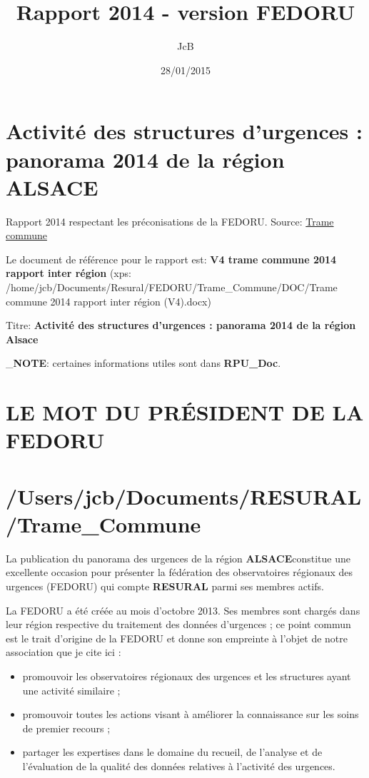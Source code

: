 \documentclass[]{article}
\title{Rapport 2014 - version FEDORU}
\author{JcB}
\date{28/01/2015}
\begin{document}
\maketitle


{
\hypersetup{linkcolor=black}
\setcounter{tocdepth}{2}
\tableofcontents
}
\section{Activité des structures d'urgences : panorama 2014 de la région
ALSACE}\label{activite-des-structures-durgences-panorama-2014-de-la-region-alsace}

Rapport 2014 respectant les préconisations de la FEDORU. Source:
\href{https://docs.google.com/document/d/101LYVqVLeHZnrujfMm3aqBYfbOwx3CPEB3Y-Lbud2Ls/edit}{Trame
commune}

Le document de référence pour le rapport est: \textbf{V4 trame commune
2014 rapport inter région} (xps:
/home/jcb/Documents/Resural/FEDORU/Trame\_Commune/DOC/Trame commune 2014
rapport inter région (V4).docx)

Titre: \textbf{Activité des structures d'urgences : panorama 2014 de la
région Alsace}

\_\textbf{NOTE}: certaines informations utiles sont dans
\textbf{RPU\_Doc}.

\section{LE MOT DU PRÉSIDENT DE LA
FEDORU}\label{le-mot-du-president-de-la-fedoru}

\section{/Users/jcb/Documents/RESURAL/Trame\_Commune}\label{usersjcbdocumentsresuraltrameux5fcommune}

La publication du panorama des urgences de la région
\textbf{ALSACE}constitue une excellente occasion pour présenter la
fédération des observatoires régionaux des urgences (FEDORU) qui compte
\textbf{RESURAL} parmi ses membres actifs.

La FEDORU a été créée au mois d'octobre 2013. Ses membres sont chargés
dans leur région respective du traitement des données d'urgences ; ce
point commun est le trait d'origine de la FEDORU et donne son empreinte
à l'objet de notre association que je cite ici :

\begin{itemize}
\itemsep1pt\parskip0pt
\item
  promouvoir les observatoires régionaux des urgences et les structures
  ayant une activité similaire ;
\item
  promouvoir toutes les actions visant à améliorer la connaissance sur
  les soins de premier recours ;
\item
  partager les expertises dans le domaine du recueil, de l'analyse et de
  l'évaluation de la qualité des données relatives à l'activité des
  urgences.
\end{itemize}
\end{document}
